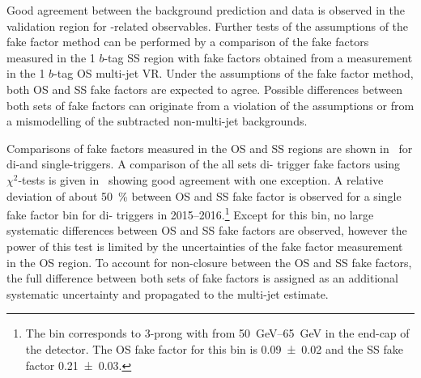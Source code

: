 Good agreement between the background prediction and data is observed
in the validation region for \tauhadvis-related observables. Further
tests of the assumptions of the fake factor method can be performed by
a comparison of the fake factors measured in the 1 $b$-tag SS region
with fake factors obtained from a measurement in the 1 $b$-tag OS
multi-jet VR. Under the assumptions of the fake factor method, both OS
and SS fake factors are expected to agree. Possible differences
between both sets of fake factors can originate from a violation of
the assumptions or from a mismodelling of the subtracted non-multi-jet
backgrounds.

Comparisons of fake factors measured in the OS and SS regions are
shown in~ for di-\tauhadvis and
single-\tauhadvis triggers. A comparison of the all sets di-\tauhadvis
trigger fake factors using $\chi^2$-tests is given
in~ showing good agreement with
one exception. %
A relative deviation of about \SI{50}{\percent} between OS and SS fake
factor is observed for a single fake factor bin for di-\tauhadvis
triggers in 2015--2016.\footnote{The bin corresponds to 3-prong
  \tauhadvis with \pT from \SIrange{50}{65}{\GeV} in the end-cap of the
  detector. The OS fake factor for this bin is \num{0.09 +- 0.02} and
  the SS fake factor \num{0.21 +- 0.03}.} Except for this bin, no
large systematic differences between OS and SS fake factors are
observed, however the power of this test is limited by the
uncertainties of the fake factor measurement in the OS region. To
account for non-closure between the OS and SS fake factors, the full
difference between both sets of fake factors is assigned as an
additional systematic uncertainty and propagated to the multi-jet
estimate.


